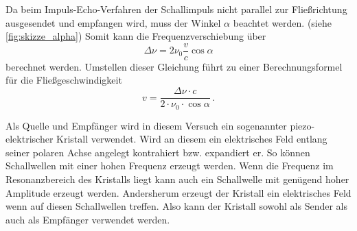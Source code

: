 Da beim Impuls-Echo-Verfahren der Schallimpuls nicht parallel zur Fließrichtung ausgesendet und empfangen wird, muss der Winkel $\alpha$ beachtet werden. (siehe \autoref{fig:skizze_alpha})
Somit kann die Frequenzverschiebung über
\begin{equation}
    \Delta \nu = 2 \nu_0 \frac{v}{c} \cos \alpha
    \label{eq:Frequenzverschiebung}
\end{equation}
berechnet werden.
Umstellen dieser Gleichung führt zu einer Berechnungsformel für die Fließgeschwindigkeit
\begin{equation}
    v = \frac{\Delta \nu \cdot c}{2 \cdot \nu_0 \cdot \cos \alpha} \, .
    \label{eq:geschwindigkeit}
\end{equation}

Als Quelle und Empfänger wird in diesem Versuch ein sogenannter piezo-elektrischer Kristall verwendet.
Wird an diesem ein elektrisches Feld entlang seiner polaren Achse angelegt kontrahiert bzw. expandiert er.
So können Schallwellen mit einer hohen Frequenz erzeugt werden.
Wenn die Frequenz im Resonanzbereich des Kristalls liegt kann auch ein Schallwelle mit genügend hoher Amplitude erzeugt werden.
Andersherum erzeugt der Kristall ein elektrisches Feld wenn auf diesen Schallwellen treffen.
Also kann der Kristall sowohl als Sender als auch als Empfänger verwendet werden.